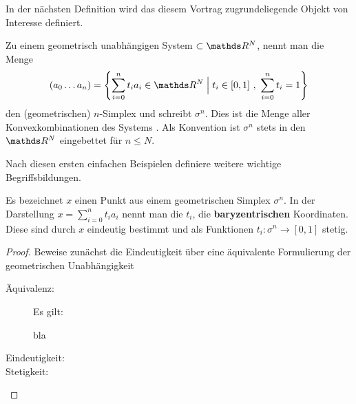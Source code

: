 In der nächsten Definition wird das diesem Vortrag zugrundeliegende Objekt von Interesse definiert.

\begin{Def}
  Zu einem geometrisch unabhängigen System \gs $\subset \R^N$, nennt man die Menge
  \begin{gather*}
    (a_0 \ldots a_n) 
      =
    \set{\sum\limits_{i=0}^n t_i a_i \in \R^N}{ t_i \in [0,1] ~,~ \sum\limits_{i=0}^n t_i = 1}
  \end{gather*}
  den (geometrischen) $n$-Simplex und schreibt $\sigma^n$. Dies ist die Menge aller Konvexkombinationen des Systems \gs. Als Konvention 
  ist $\sigma^n$ stets in den $\R^N$ eingebettet für $n \leq N$.
\end{Def}


Nach diesen ersten einfachen Beispielen definiere weitere wichtige
Begriffsbildungen.

\begin{Lem}
  \normalfont Es bezeichnet $x$ einen Punkt aus einem geometrischen Simplex
  $\sigma^n$. In der Darstellung $x = \sum\limits_{i=0}^n t_i a_i$ nennt
  man die $t_i$, die \textbf{baryzentrischen} Koordinaten. Diese sind durch $x$
  eindeutig bestimmt und als Funktionen $t_i : \sigma^n \rightarrow [0,1]$ stetig.
  \begin{proof}
  	Beweise zunächst die Eindeutigkeit über eine äquivalente Formulierung der
  	geometrischen Unabhängigkeit 
  	\begin{description}
  		\item[Äquivalenz: ] Es gilt:
	  		\begin{Beh}
	  			bla
	  		\end{Beh}
  		\item[Eindeutigkeit: ] 
  		\item[Stetigkeit: ]
  	\end{description}
  \end{proof}
	
	
\end{Lem}

